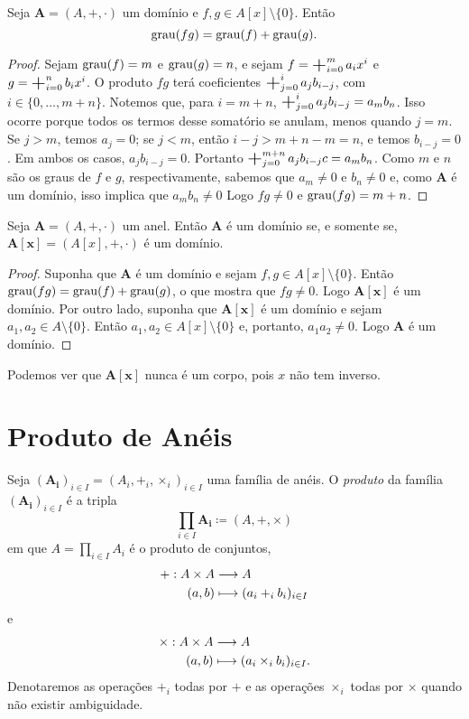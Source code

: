 \begin{prop}
	Seja $\bm A=(A,+,\cdot)$ um domínio e $f,g \in A[x]\setminus\{0\}$. Então
	\begin{equation*}
	\operatorname{grau}(fg)=\operatorname{grau}(f)+\operatorname{grau}(g).
	\end{equation*}
\end{prop}
\begin{proof}
	Sejam $\operatorname{grau}(f)=m$ e $\operatorname{grau}(g)=n$, e sejam $f = \bigplus_{i=0}^m a_ix^i$ e $g = \bigplus_{i=0}^n b_ix^i$. O produto $fg$ terá coeficientes $\bigplus_{j=0}^i a_jb_{i-j}$, com $i \in \{0,\ldots,m+n\}$. Notemos que, para $i = m+n$, $\bigplus_{j=0}^i a_jb_{i-j} = a_mb_n$. Isso ocorre porque todos os termos desse somatório se anulam, menos quando $j=m$. Se $j>m$, temos $a_j=0$; se $j<m$, então $i-j > m+n-m = n$, e temos $b_{i-j}=0$. Em ambos os casos, $a_jb_{i-j}=0$. Portanto $\bigplus_{j=0}^{m+n} a_jb_{i-j}c= a_mb_n$. Como $m$ e $n$ são os graus de $f$ e $g$, respectivamente, sabemos que $a_m \neq 0$ e $b_n \neq 0$ e, como $\bm A$ é um domínio, isso implica que $a_mb_n \neq 0$ Logo $fg \neq 0$ e $\operatorname{grau}(fg)=m+n$.
\end{proof}

\begin{prop}
	Seja $\bm A=(A,+,\cdot)$ um anel. Então $\bm A$ é um domínio se, e somente se, $\bm{A[x]}=(A[x],+,\cdot)$ é um domínio.
\end{prop}
\begin{proof}
	Suponha que $\bm A$ é um domínio e sejam $f,g \in A[x]\setminus\{0\}$. Então $\operatorname{grau}(fg)=\operatorname{grau}(f)+\operatorname{grau}(g)$, o que mostra que $fg \neq 0$. Logo $\bm{A[x]}$ é um domínio. Por outro lado, suponha que $\bm{A[x]}$ é um domínio e sejam $a_1,a_2 \in A\setminus\{0\}$. Então $a_1,a_2 \in A[x]\setminus\{0\}$ e, portanto, $a_1a_2 \neq 0$. Logo $\bm A$ é um domínio.
\end{proof}

Podemos ver que $\bm{A[x]}$ nunca é um corpo, pois $x$ não tem inverso.

\section{Produto de Anéis}

\begin{defi}
Seja $(\bm{A_i})_{i \in I}=(A_i,+_i,\times_i)_{i \in I}$ uma família de anéis. O \emph{produto} da família $(\bm{A_i})_{i \in I}$ é a tripla
	\begin{equation*}
	\prod_{i \in I} \bm{A_i} \coloneqq (A,+,\times)
	\end{equation*}
em que $A = \prod_{i \in I} A_i$ é o produto de conjuntos,
	\begin{align*}
	{+}: {A \times A} &\longrightarrow {A} \\{(a,b)} &\longmapsto {(a_i +_i b_i)_{i \in I}}
	\end{align*}
e
	\begin{align*}
	{\times}: {A \times A} &\longrightarrow {A} \\{(a,b)} &\longmapsto {(a_i \times_i b_i)_{i \in I}}.
	\end{align*}
Denotaremos as operações $+_i$ todas por $+$ e as operações $\times_i$ todas por $\times$ quando não existir ambiguidade.
\end{defi}

